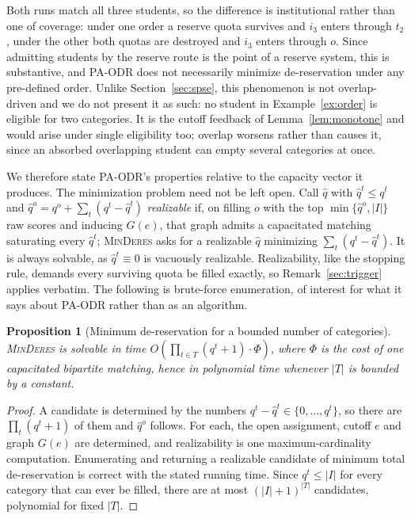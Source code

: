 \documentclass[a4paper,twoside]{article}
\newtheorem{proposition}{Proposition}
\theoremstyle{definition}
\begin{document}
Both runs match all three students, so the difference is institutional rather than one of coverage: under one order a reserve quota survives and $i_3$ enters through $t_2$, under the other both quotas are destroyed and $i_3$ enters through $o$. Since admitting students by the reserve route is the point of a reserve system, this is substantive, and PA-ODR does not necessarily minimize de-reservation under any pre-defined order. Unlike Section~\ref{sec:spse}, this phenomenon is not overlap-driven and we do not present it as such: no student in Example~\ref{ex:order} is eligible for two categories. It is the cutoff feedback of Lemma~\ref{lem:monotone} and would arise under single eligibility too; overlap worsens rather than causes it, since an absorbed overlapping student can empty several categories at once.

We therefore state PA-ODR's properties relative to the capacity vector it produces. The minimization problem need not be left open. Call $\hat q$ with $\hat q^t\le q^t$ and $\hat q^o=q^o+\sum_{t}(q^t-\hat q^t)$ \emph{realizable} if, on filling $o$ with the top $\min\{\hat q^o,|I|\}$ raw scores and inducing $G(e)$, that graph admits a capacitated matching saturating every $\hat q^t$; \textsc{MinDeres} asks for a realizable $\hat q$ minimizing $\sum_t(q^t-\hat q^t)$. It is always solvable, as $\hat q^t\equiv0$ is vacuously realizable. Realizability, like the stopping rule, demands every surviving quota be filled exactly, so Remark~\ref{sec:trigger} applies verbatim. The following is brute-force enumeration, of interest for what it says about PA-ODR rather than as an algorithm.

\begin{proposition}[Minimum de-reservation for a bounded number of categories]
\label{prop:minderes}
\textsc{MinDeres} is solvable in time $O(\prod_{t\in T}(q^t+1)\cdot\Phi)$, where $\Phi$ is the cost of one capacitated bipartite matching, hence in polynomial time whenever $|T|$ is bounded by a constant.
\end{proposition}

\begin{proof}
A candidate is determined by the numbers $q^t-\hat q^t\in\{0,\dots,q^t\}$, so there are $\prod_t(q^t+1)$ of them and $\hat q^o$ follows. For each, the open assignment, cutoff $e$ and graph $G(e)$ are determined, and realizability is one maximum-cardinality computation. Enumerating and returning a realizable candidate of minimum total de-reservation is correct with the stated running time. Since $q^t\le|I|$ for every category that can ever be filled, there are at most $(|I|+1)^{|T|}$ candidates, polynomial for fixed $|T|$.
\end{proof}
\end{document}
